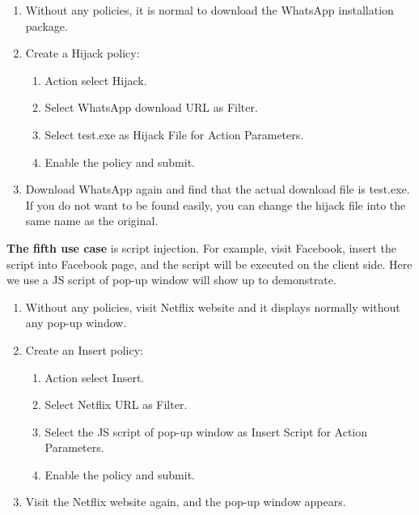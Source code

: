 \begin{description}[leftmargin=0pt,itemindent=0em]
    \item[] 
    \begin{enumerate}
        \item	Without any policies, it is normal to download the WhatsApp installation package.
        \item	Create a Hijack policy:
        \begin{enumerate}
            \item	Action select Hijack.
            \item	Select WhatsApp download URL as Filter.
            \item	Select test.exe as Hijack File for Action Parameters.
            \item	Enable the policy and submit.
        \end{enumerate}
        \item	Download WhatsApp again and find that the actual download file is test.exe. If you do not want to be found easily, you can change the hijack file into the same name as the original.
    \end{enumerate}	
\end{description}

\textbf{The fifth use case} is script injection. For example, visit Facebook, insert the script into Facebook page, and the script will be executed on the client side. Here we use a JS script of pop-up window will show up to demonstrate. 

\begin{description}[leftmargin=0pt,itemindent=0em]
    \item[] 
    \begin{enumerate}
        \item	Without any policies, visit Netflix website and it displays normally without any pop-up window.
        \item	Create an Insert policy:
        \begin{enumerate}
            \item	Action select Insert.
            \item	Select Netflix URL as Filter.
            \item	Select the JS script of pop-up window as Insert Script for Action Parameters.
            \item	Enable the policy and submit.
        \end{enumerate}	
        \item	Visit the Netflix website again, and the pop-up window appears.
    \end{enumerate}	
\end{description}

